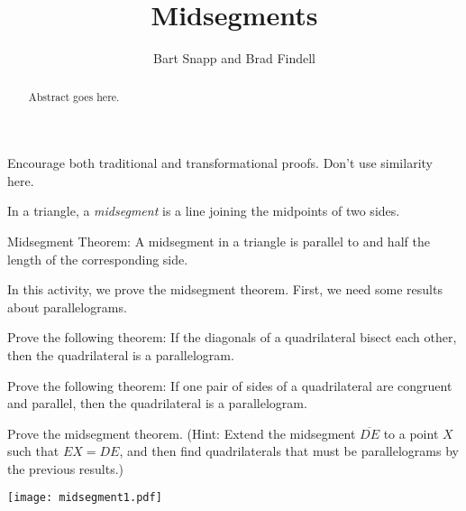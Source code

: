 \documentclass{ximera}
\title{Midsegments}
\author{Bart Snapp and Brad Findell}
\begin{document}
\begin{abstract}
Abstract goes here.  
\end{abstract}
\maketitle

\begin{teachingnote}
Encourage both traditional and transformational proofs.  Don't use similarity here.
\end{teachingnote}

\begin{definition}
In a triangle, a \emph{midsegment} is a line joining the midpoints of two sides.  
\end{definition}

\begin{theorem}
Midsegment Theorem:  A midsegment in a triangle is parallel to and half the length of the corresponding side.
\end{theorem}

In this activity, we prove the midsegment theorem.  First, we need some results about parallelograms. 

\begin{problem}
Prove the following theorem:  If the diagonals of a quadrilateral bisect each other, then the quadrilateral is a parallelogram. 
\end{problem}

\begin{problem}
Prove the following theorem:  If one pair of sides of a quadrilateral are congruent and parallel, then the quadrilateral is a parallelogram. 
\end{problem}

\begin{problem}
Prove the midsegment theorem.  (Hint:  Extend the midsegment $\overline{DE}$ to a point $X$ such that $EX=DE$, and then find quadrilaterals that must be parallelograms by the previous results.)  
\begin{image}
\texttt{[image: midsegment1.pdf]}
\end{image}
\end{problem}
\end{document}
